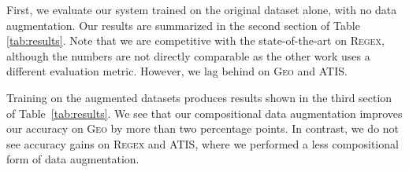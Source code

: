 \documentclass[11pt,letterpaper]{article}
\newcommand{\atis}{\textsc{ATIS}\xspace}
\newcommand{\regex}{\textsc{Regex}\xspace}
\newcommand{\geo}{\textsc{Geo}\xspace}
\begin{document}
First, we evaluate our system trained on the original dataset alone,
with no data augmentation.
Our results are summarized in the second section of Table \ref{tab:results}.
Note that we are competitive with the state-of-the-art on \regex, 
although the numbers are not directly
comparable as the other work uses a different evaluation metric.
However, we lag behind on \geo and \atis.

Training on the augmented datasets produces results shown in the
third section of Table~\ref{tab:results}.
We see that our compositional data augmentation improves 
our accuracy on \geo by more than two percentage points.
In contrast, we do not see accuracy gains on \regex and \atis,
where we performed a less compositional form of data augmentation.

\end{document}
